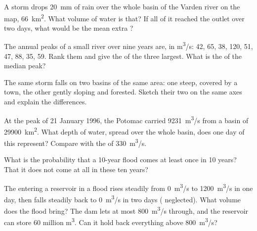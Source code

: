 \begin{exercise}[$\star\star$]\label{exo:g10:drainage-basins:7}
A storm drops \qty{20}{mm} of rain over the whole basin of the Varden river
on the map, \qty{66}{km^2}. What volume of water is that? If all of it
reached the outlet over two days, what would be the mean extra ?
\end{exercise}

\begin{exercise}[$\star\star$]\label{exo:g10:drainage-basins:8}
The annual peaks of a small river over nine years are, in \unit{m^3/s}:
\num{42}, \num{65}, \num{38}, \num{120}, \num{51}, \num{47}, \num{88},
\num{35}, \num{59}. Rank them and give the  of the three
largest. What is the  of the median peak?
\end{exercise}

\begin{exercise}[$\star\star$]\label{exo:g10:drainage-basins:9}
The same storm falls on two basins of the same area: one steep, covered by
a town, the other gently sloping and forested. Sketch their two 
on the same axes and explain the differences.
\end{exercise}

\begin{exercise}[$\star\star$]\label{exo:g10:drainage-basins:10}
At the peak of 21 January 1996, the Potomac carried \qty{9231}{m^3/s} from a
basin of \qty{29900}{km^2}. What depth of water, spread over the whole
basin, does one day of this  represent? Compare with the  of
\qty{330}{m^3/s}.
\end{exercise}

\begin{exercise}[$\star\star$]\label{exo:g10:drainage-basins:11}
What is the probability that a \num{10}-year flood comes at least once in
\num{10} years? That it does not come at all in these ten years?
\end{exercise}

\begin{exercise}[$\star\star\star$]\label{exo:g10:drainage-basins:12}
The  entering a reservoir in a flood rises steadily from
\qty{0}{m^3/s} to \qty{1200}{m^3/s} in one day, then falls steadily back to
\qty{0}{m^3/s} in two days ( neglected). What volume does the flood
bring? The dam lets at most \qty{800}{m^3/s} through, and the reservoir can
store \num{60} million \unit{m^3}. Can it hold back everything above
\qty{800}{m^3/s}?
\end{exercise}

